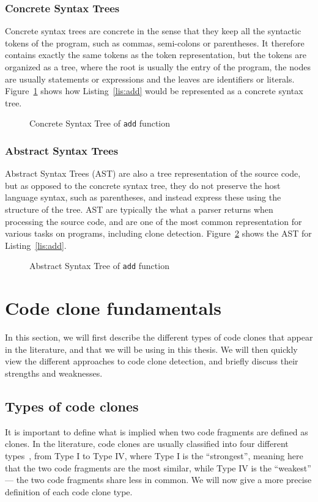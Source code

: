 \subsubsection{Concrete Syntax Trees}
Concrete syntax trees are concrete in the sense that they keep all the syntactic
tokens of the program, such as commas, semi-colons or parentheses. It therefore
contains exactly the same tokens as the token representation, but the tokens
are organized as a tree, where the root is usually the entry of the program,
the nodes are usually statements or expressions and the leaves are identifiers
or literals. Figure~\ref{fig:add-cst} shows how Listing~\ref{lis:add} would be
represented as a concrete syntax tree.
\begin{figure}[tb]
  \begin{center}
    \caption{\label{fig:add-cst}Concrete Syntax Tree of \lstinline{add} function}
  \end{center}
\end{figure}
\subsubsection{Abstract Syntax Trees}
Abstract Syntax Trees (AST) are also a tree representation of the source code,
but as opposed to the concrete syntax tree, they do not preserve the host
language syntax, such as parentheses, and instead express these using the
structure of the tree.
AST are typically the what a parser returns when processing the source code, and
are one of the most common representation for various tasks on programs,
including clone detection.
Figure~\ref{fig:add-ast} shows the AST for Listing~\ref{lis:add}.
\begin{figure}[tb]
  \begin{center}
    \caption{\label{fig:add-ast}Abstract Syntax Tree of \lstinline{add} function}
  \end{center}
\end{figure}
\section{Code clone fundamentals}
In this section, we will first describe the different types of code clones
that appear in the literature, and that we will be using in this thesis.
We will then quickly view the different approaches to code clone detection,
and briefly discuss their strengths and weaknesses.
\subsection{Types of code clones}
It is important to define what is implied when two code fragments are
defined as clones. In the literature, code clones are usually
classified into four different types~\cite{Roy07asurvey}, from Type I to Type IV,
where Type I is the ``strongest'', meaning here that the two code fragments are
the most similar, while Type IV is the ``weakest'' --- the two code fragments
share less in common. We will now give a more precise definition of each code
clone type.
